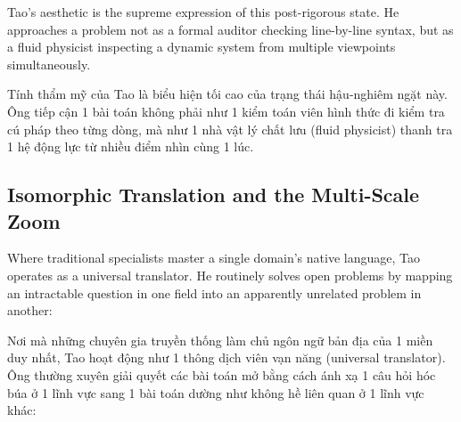 \documentclass[11pt]{article}
\begin{document}
Tao's aesthetic is the supreme expression of this post-rigorous state. He approaches a problem not as a formal auditor checking line-by-line syntax, but as a fluid physicist inspecting a dynamic system from multiple viewpoints simultaneously.

Tính thẩm mỹ của Tao là biểu hiện tối cao của trạng thái hậu-nghiêm ngặt này. Ông tiếp cận 1 bài toán không phải như 1 kiểm toán viên hình thức đi kiểm tra cú pháp theo từng dòng, mà như 1 nhà vật lý chất lưu (fluid physicist) thanh tra 1 hệ động lực từ nhiều điểm nhìn cùng 1 lúc.

\subsection{Isomorphic Translation and the Multi-Scale Zoom}
Where traditional specialists master a single domain's native language, Tao operates as a universal translator. He routinely solves open problems by mapping an intractable question in one field into an apparently unrelated problem in another:

Nơi mà những chuyên gia truyền thống làm chủ ngôn ngữ bản địa của 1 miền duy nhất, Tao hoạt động như 1 thông dịch viên vạn năng (universal translator). Ông thường xuyên giải quyết các bài toán mở bằng cách ánh xạ 1 câu hỏi hóc búa ở 1 lĩnh vực sang 1 bài toán dường như không hề liên quan ở 1 lĩnh vực khác:
\end{document}
